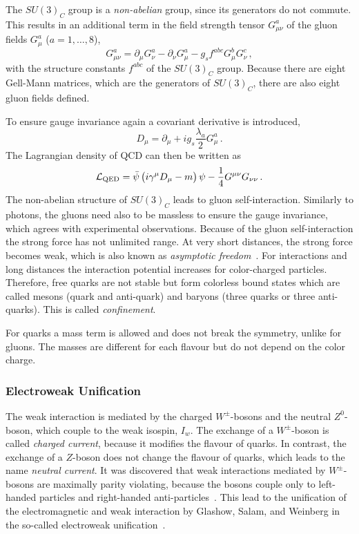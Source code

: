 The $SU(3)_C$ group is a \emph{non-abelian} group, since its generators do not commute.
This results in an additional term in the field strength tensor $G_{\mu\nu}^a$ of the gluon fields $G_\mu^a$ ($a = 1, \ldots, 8$),
\begin{equation}
    G_{\mu\nu}^a = \partial_\mu G_\nu^a -  \partial_\nu G_\mu^a - g_s f^{abc} G_\mu^b G_\nu^c \,,
\end{equation}
with the structure constants $f^{abc}$ of the $SU(3)_C$ group.
Because there are eight Gell-Mann matrices, which are the generators of $SU(3)_C$, there are also eight gluon fields defined.

To ensure gauge invariance again a covariant derivative is introduced,
\begin{equation}
    D_\mu = \partial_\mu + i g_s \frac{\lambda_a}{2} G_\mu^a \,.
\end{equation}
The Lagrangian density of QCD can then be written as
\begin{equation}
    \mathcal{L}_\text{QED} = \bar{\psi} \left( i \gamma^\mu D_\mu -m \right) \psi - \frac{1}{4} G^{\mu\nu} G_{\nu\nu} \,.
\end{equation}
The non-abelian structure of $SU(3)_C$ leads to gluon self-interaction.
Similarly to photons, the gluons need also to be massless to ensure the gauge invariance, which agrees with experimental observations.
Because of the gluon self-interaction the strong force has not unlimited range.
At very short distances, the strong force becomes weak, which is also known as \emph{asymptotic freedom}~\cite{AsymFreedom1,AsymFreedom2}.
For interactions and long distances the interaction potential increases for color-charged particles.
Therefore, free quarks are not stable but form colorless bound states which are called mesons (quark and anti-quark) and
baryons (three quarks or three anti-quarks).
This is called \emph{confinement}.

For quarks a mass term is allowed and does not break the symmetry, unlike for gluons.
The masses are different for each flavour but do not depend on the color charge.

\subsubsection{Electroweak Unification}

The weak interaction is mediated by the charged $W^\pm$-bosons and the neutral $Z^0$-boson, which couple to the weak
isospin, $I_w$.
The exchange of a $W^\pm$-boson is called \emph{charged current}, because it modifies the flavour of quarks.
In contrast, the exchange of a $Z$-boson does not change the flavour of quarks, which leads to the name \emph{neutral current}.
It was discovered that weak interactions mediated by $W^\pm$-bosons are maximally parity violating, because the bosons couple only to
left-handed particles and right-handed anti-particles~\cite{PhysRev.104.254,PhysRev.105.1413}.
This lead to the unification of the electromagnetic and weak interaction by Glashow, Salam, and Weinberg in the
so-called electroweak unification~\cite{Glashow1961,Salam1959,Weinberg1967}.


